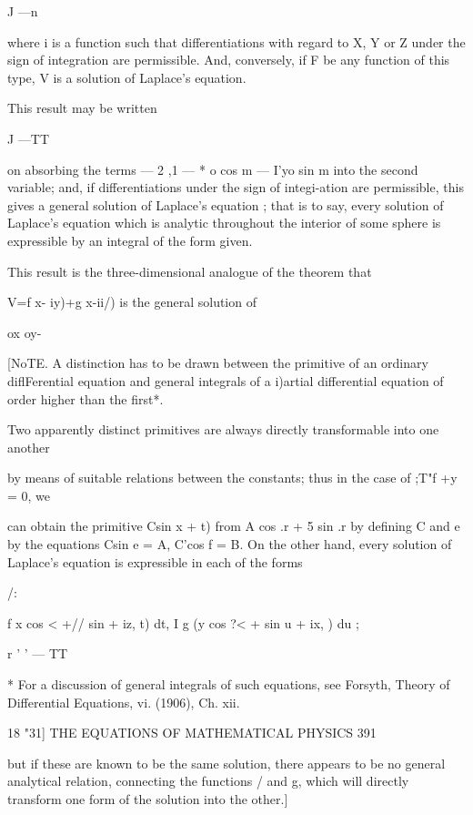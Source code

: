 J —n 

where i  is a function such that differentiations with regard to X, Y or Z 
under the sign of integration are permissible. And, conversely, if F be any 
function of this type, V is a solution of Laplace's equation. 

This result may be written 



J —TT 



on absorbing the terms — 2 ,1 — * o cos m — I'yo sin m into the second variable; 
and, if differentiations under the sign of integi-ation are permissible, this 
gives a general solution of Laplace's equation ; that is to say, every solution 
of Laplace's equation which is analytic throughout the interior of some 
sphere is expressible by an integral of the form given. 

This result is the three-dimensional analogue of the theorem that 

V=f x- iy)+g x-ii/) 
is the general solution of 

ox  oy- 

[NoTE. A distinction has to be drawn between the primitive of an ordinary diflFerential 
equation and general integrals of a i)artial differential equation of order higher than the 
first*. 

Two apparently distinct primitives are always directly transformable into one another 

by means of suitable relations between the constants; thus in the case of ;T"f +y = 0, we 

can obtain the primitive Csin  x + t) from A cos .r + 5 sin .r by defining C and e by the 
equations Csin e = A, C'cos f = B. On the other hand, every solution of Laplace's equation 
is expressible in each of the forms 



/: 



f x cos < +// sin   + iz, t) dt, I g (y cos ?< +    sin u + ix,  ) du ; 

r ' ' — TT 



* For a discussion of general integrals of such equations, see Forsyth, Theory of Differential 
Equations, vi. (1906), Ch. xii. 



18 "31] THE EQUATIONS OF MATHEMATICAL PHYSICS 391 

but if these are known to be the same solution, there appears to be no general analytical 
relation, connecting the functions / and g, which will directly transform one form of 
the solution into the other.] 

